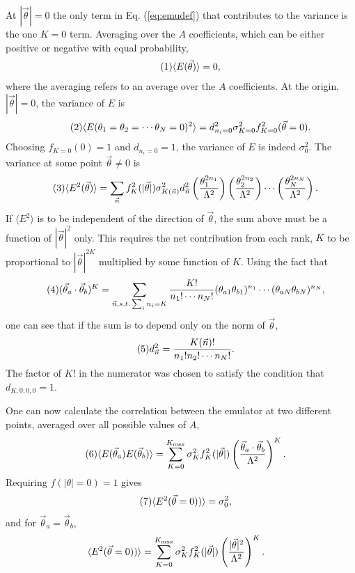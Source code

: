 \documentclass[12pt]{article}
\numberwithin{equation}{section}
\numberwithin{figure}{section}
\newcommand\eqnumber{\addtocounter{equation}{1}\tag{\theequation}}
\begin{document}
At $|\vec{\theta}|=0$ the only term in Eq. (\ref{eq:emudef}) that contributes to the variance is the one $K=0$ term. Averaging over the $A$ coefficients, which can be either positive or negative with equal probability,
\begin{align*}\eqnumber
\langle E(\vec{\theta})\rangle=0,
\end{align*}
where the averaging refers to an average over the $A$ coefficients. At the origin, $|\vec{\theta}|=0$, the variance of $E$ is
\begin{align*}\eqnumber
\langle E(\theta_1=\theta_2=\cdots\theta_N=0)^2\rangle=d^2_{n_i=0}\sigma_{K=0}^2f_{K=0}^2(\vec{\theta}=0).
\end{align*}
Choosing $f_{K=0}(0)=1$ and $d_{n_i=0}=1$, the variance of $E$ is indeed $\sigma_0^2$. 
The variance at some point $\vec{\theta}\ne 0$ is 
\begin{align*}\eqnumber
\langle E^2(\vec{\theta})\rangle &=
\sum_{\vec{n}} 
f_K^2(|\vec{\theta}|)\sigma^2_{K(\vec{n})} d_{\vec{n}}^2
\left(\frac{\theta_1^{2n_1}}{\Lambda^2}\right)\left(\frac{\theta_2^{2n_2}}{\Lambda^2}\right)\cdots 
\left(\frac{\theta_N^{2n_N}}{\Lambda^2}\right).
\end{align*}
If $\langle E^2\rangle$ is to be independent of the direction of $\vec{\theta}$, the sum above must be a function of $|\vec{\theta}|^2$ only. This requires the net contribution from each rank, $K$ to be proportional to  $|\vec{\theta}|^{2K}$ multiplied by some function of $K$. Using the fact that
\begin{align*}\eqnumber
(\vec{\theta}_a\cdot \vec{\theta}_b)^K&=\sum_{\vec{n},s.t. \sum_i n_i=K}\frac{K!}{n_1!\cdots n_N!}(\theta_{a1}\theta_{b1})^{n_1}\cdots(\theta_{aN}\theta_{bN})^{n_N},
\end{align*}
one can see that if the sum is to depend only on the norm of $\vec{\theta}$,
\begin{align*}\eqnumber
d_{\vec{n}}^2&=\frac{K(\vec{n})!}{n_1!n_2!\cdots n_N!}.
\end{align*}
The factor of $K!$ in the numerator was chosen to satisfy the condition that $d_{K,0,0,0}=1$.

One can now calculate the correlation between the emulator at two different points, averaged over all possible values of $A$,
\begin{align*}\eqnumber
\langle E(\vec{\theta}_a)E(\vec{\theta}_b)\rangle &=
\sum_{K=0}^{K_{\rm max}}\sigma_K^2f_K^2(|\vec{\theta}|)
\left(\frac{\vec{\theta}_a\cdot\vec{\theta}_b}{\Lambda^2}\right)^{K}.
\end{align*}
Requiring $f(|\theta|=0)=1$ gives
\begin{align*}\eqnumber
\langle E^2(\vec{\theta}=0))\rangle &=\sigma_0^2,
\end{align*}
and for $\vec{\theta}_a=\vec{\theta}_b$,
\begin{eqnarray}
\langle E^2(\vec{\theta}=0))\rangle &=\sum_{K=0}^{K_{\rm max}}
\sigma_K^2f_K^2(|\vec{\theta}|)\left(\frac{|\vec{\theta}|^2}{\Lambda^2}\right)^K.
\end{eqnarray}
\end{document}
